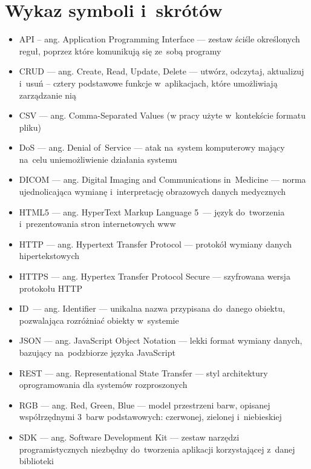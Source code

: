 \documentclass[a4paper,11pt,twoside,openright]{report}
\newcommand\blankpage{%
    \null
    \thispagestyle{empty}%
    \newpage}
\theoremstyle{definition}
\begin{document}



\afterpage{\blankpage}
\chapter*{Wykaz symboli i~skrótów}


\begin{itemize}[noitemsep]
\item API -- ang. Application Programming Interface --- zestaw ściśle określonych reguł, poprzez które komunikują się ze~sobą programy\\
\item CRUD --- ang. Create, Read, Update, Delete --- utwórz, odczytaj, aktualizuj i~usuń -- cztery podstawowe funkcje w~aplikacjach, które umożliwiają zarządzanie nią\\
\item CSV --- ang. Comma-Separated Values (w pracy użyte w~kontekście formatu pliku) \\
\item DoS --- ang. Denial of~Service --- atak na~system komputerowy mający na~celu uniemożliwienie działania systemu\\
\item DICOM --- ang. Digital Imaging and Communications in~Medicine --- norma ujednolicająca wymianę i~interpretację obrazowych danych medycznych\\
\item HTML5 --- ang. HyperText Markup Language 5~--- język do~tworzenia i~prezentowania stron internetowych www\\
\item HTTP --- ang. Hypertext Transfer Protocol --- protokół wymiany danych hipertekstowych\\
\item HTTPS --- ang. Hypertex Transfer Protocol Secure --- szyfrowana wersja protokołu HTTP\\
\item ID~--- ang. Identifier --- unikalna nazwa przypisana do~danego obiektu, pozwalająca rozróżniać obiekty w~systemie\\
\item JSON --- ang. JavaScript Object Notation --- lekki format wymiany danych, bazujący na~podzbiorze języka JavaScript\\
\item REST --- ang. Representational State Transfer --- styl architektury oprogramowania dla systemów rozproszonych\\
\item RGB --- ang. Red, Green, Blue --- model przestrzeni barw, opisanej współrzędnymi 3~barw podstawowych: czerwonej, zielonej i~niebieskiej\\
\item SDK --- ang. Software Development Kit --- zestaw narzędzi programistycznych niezbędny do~tworzenia aplikacji korzystającej z~danej biblioteki\\
\end{itemize}
\end{document}
